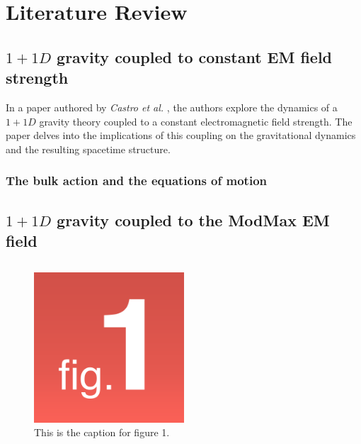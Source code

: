 
\chapter{Literature Review}

\label{Chapter2}




\section{$1+1D$ gravity coupled to constant EM field strength}
\label{castro-paper}

In a paper authored by \textit{Castro et al.} \cite{castro2019}, the authors explore the dynamics of a $1+1D$ gravity theory coupled to a constant electromagnetic field strength. The paper delves into the implications of this coupling on the gravitational dynamics and the resulting spacetime structure. 

\subsection{The bulk action and the equations of motion}

\section{$1+1D$ gravity coupled to the ModMax EM field}
\label{drc-hemant-paper}



\section{}

\lipsum[2-4]

\begin{figure}
    \centering
    \includegraphics[width=0.5\textwidth]{Pictures/Figure 1.png}
    \caption{This is the caption for figure 1.}
    \label{figure:chap2_Figure_2}
\end{figure}



